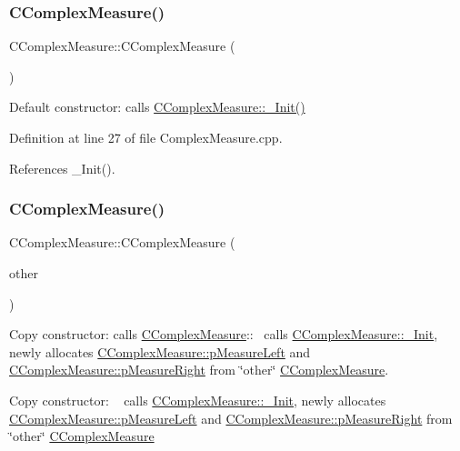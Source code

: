 \subsubsection{\texorpdfstring{C\+Complex\+Measure()}{CComplexMeasure()}\hspace{0.1cm}{\footnotesize\ttfamily [1/4]}}
{\footnotesize\ttfamily C\+Complex\+Measure\+::\+C\+Complex\+Measure (\begin{DoxyParamCaption}{ }\end{DoxyParamCaption})}

Default constructor\+: calls \hyperlink{classCComplexMeasure_aed6efc43efe99d8cf1072ac98ec8d21c}{C\+Complex\+Measure\+::\+\_\+\+Init()} 

Definition at line 27 of file Complex\+Measure.\+cpp.



References \+\_\+\+Init().

\mbox{\label{classCComplexMeasure_a50de70ddcb4b2b64c238d686e2f85419}} 
\subsubsection{\texorpdfstring{C\+Complex\+Measure()}{CComplexMeasure()}\hspace{0.1cm}{\footnotesize\ttfamily [2/4]}}
{\footnotesize\ttfamily C\+Complex\+Measure\+::\+C\+Complex\+Measure (\begin{DoxyParamCaption}\item[{const \hyperlink{classCComplexMeasure}{C\+Complex\+Measure} \&}]{other }\end{DoxyParamCaption})}



Copy constructor\+: calls \hyperlink{classCComplexMeasure}{C\+Complex\+Measure}\+:\+:~\newline
 calls \hyperlink{classCComplexMeasure_aed6efc43efe99d8cf1072ac98ec8d21c}{C\+Complex\+Measure\+::\+\_\+\+Init}, newly allocates \hyperlink{classCComplexMeasure_a4d68f86891a036df81f5b1a344c36f27}{C\+Complex\+Measure\+::p\+Measure\+Left} and \hyperlink{classCComplexMeasure_abbafc4b16676d223ed34860b8ece1b6b}{C\+Complex\+Measure\+::p\+Measure\+Right} from \char`\"{}other\char`\"{} \hyperlink{classCComplexMeasure}{C\+Complex\+Measure}. 

Copy constructor\+: ~\newline
 calls \hyperlink{classCComplexMeasure_aed6efc43efe99d8cf1072ac98ec8d21c}{C\+Complex\+Measure\+::\+\_\+\+Init}, newly allocates \hyperlink{classCComplexMeasure_a4d68f86891a036df81f5b1a344c36f27}{C\+Complex\+Measure\+::p\+Measure\+Left} and \hyperlink{classCComplexMeasure_abbafc4b16676d223ed34860b8ece1b6b}{C\+Complex\+Measure\+::p\+Measure\+Right} from \char`\"{}other\char`\"{} \hyperlink{classCComplexMeasure}{C\+Complex\+Measure}


